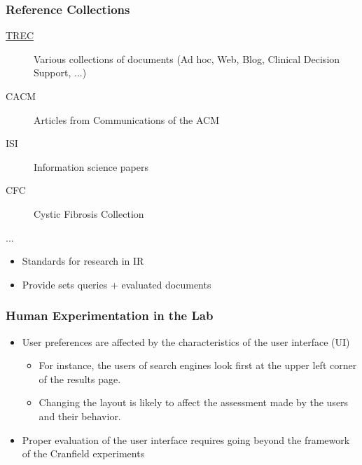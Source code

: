 \documentclass[svgnames]{beamer}
\begin{document}
\begin{frame}
  \frametitle{Reference Collections}

  \begin{block}{}
    \begin{description}
    \item[\href{http://trec.nist.gov/data.html}{TREC}] Various collections of
        documents (Ad hoc, Web, Blog, Clinical Decision Support, ...)
    \item[CACM] Articles from Communications of the ACM
    \item[ISI] Information science papers
    \item[CFC] Cystic Fibrosis Collection
    \item[...]
    \end{description}
  \end{block}

  \begin{block}{}
    \begin{itemize}
    \item Standards for research in IR
    \item Provide sets queries + evaluated documents
    \end{itemize}
  \end{block}
\end{frame}


\begin{frame}
  \frametitle{Human Experimentation in the Lab}

\begin{itemize}
\item User preferences are affected by the characteristics of the user interface (UI)
\begin{itemize} 
\item For instance, the users of search engines look
  first at the upper left corner of the results page. 
\item Changing the layout is likely to affect the assessment
  made by the users and their behavior.
\end{itemize}
\item Proper evaluation of the user interface requires going beyond
  the framework of the Cranfield experiments
\end{itemize}


\end{frame}
\end{document}

